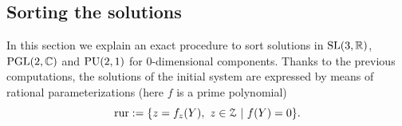%

\subsection{Sorting the solutions}
In this section we explain an exact procedure to sort solutions in
$\textrm{SL}(3,\mathbb{R})$, $\textrm{PGL}(2,\mathbb{C})$ and $\textrm{PU}(2,1)$ for 0-dimensional components.
Thanks to the previous computations, the solutions of the initial system are
expressed by means of rational parameterizations (here $f$ is a prime polynomial)
$$\mathrm{rur}:=\{z=f_{z}(Y),\ z \in \cZ\ |\ f(Y)=0\}.$$
